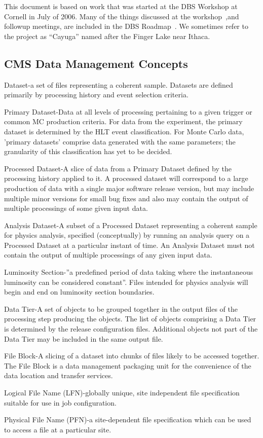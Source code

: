 \documentclass{cmspaper}
\begin{document}
This document is based on work that was started at the DBS Workshop at Cornell in July of 2006. Many of the things discussed at the workshop~\cite{dbs-workshop},and followup meetings, are included in the DBS Roadmap~\cite{dbs-roadmap}. We sometimes refer to the project as ``Cayuga'' named after the Finger Lake near Ithaca. 

\subsection{CMS Data Management Concepts}

\begin{description}
\item{Dataset}-a set of files representing a coherent sample.  Datasets are
defined primarily by processing history and event selection criteria.
\item{Primary Dataset}-Data at all levels of processing pertaining to a given
trigger or common MC production criteria.  For data from the experiment, the
primary dataset is determined by the HLT event classification.
For Monte Carlo data, 'primary datasets' comprise
data generated with the same parameters; the granularity of this
classification has yet to be decided.
\item{Processed Dataset}-A slice of data from a Primary Dataset defined by the
processing history applied to it.  A processed dataset
will correspond to a large production of data with a
single major software release version, but may include
multiple minor versions for small bug fixes and also
may contain the output of multiple processings of
some given input data.
\item{Analysis Dataset}-A subset of a Processed Dataset representing a
coherent sample for physics analysis, 
specified (conceptually) by running an analysis query on a Processed Dataset at
a particular instant of time.  An Analysis Dataset must not contain
the output of multiple processings of any given input data.
\item{Luminosity Section}-''a predefined period of data taking where the
instantaneous luminosity can be considered constant''.  Files intended
for physics analysis will begin and end on luminosity section boundaries.
\item{Data Tier}-A set of objects to be grouped together in the output
files of the processing step producing the objects.  The list of objects
comprising a Data Tier is determined by the release configuration files.
Additional objects not part of the Data Tier may be included in the same
output file.
\item{File Block}-A slicing of a dataset into chunks of files 
likely to be accessed together.  The File Block is a
data management packaging unit for the convenience of the data
location and transfer services.
\item{Logical File Name (LFN)}-globally unique, site independent
file specification suitable for use in job configuration.
\item{Physical File Name (PFN)}-a site-dependent file specification
which can be used to access a file at a particular site.
\end{description}
\end{document}
